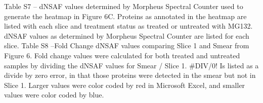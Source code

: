 Table S7 – dNSAF values determined by Morpheus Spectral Counter used to generate the heatmap in Figure 6C. Proteins as annotated in the heatmap are listed with each slice and treatment status as treated or untreated with MG132. dNSAF values as determined by Morpheus Spectral Counter \citep{gemperline16} are listed for each slice.
Table S8 –Fold Change dNSAF values comparing Slice 1 and Smear from Figure 6. Fold change values were calculated for both treated and untreated samples by dividing the dNSAF values for Smear / Slice 1. \#DIV/0! Is listed as a divide by zero error, in that those proteins were detected in the smear but not in Slice 1. Larger values were color coded by red in Microsoft Excel, and smaller values were color coded by blue.

\begin{singlespace}

\renewcommand\bibname{Literature Cited}

\end{singlespace}
